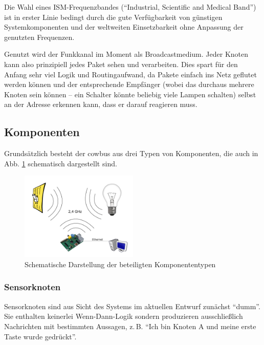 \documentclass{IEEEtran}
\begin{document}
        Die Wahl eines ISM-Frequenzbandes (\enquote{Industrial, Scientific and Medical Band})
        ist in erster Linie bedingt durch die gute Verfügbarkeit von günstigen
        Systemkomponenten und der weltweiten Einsetzbarkeit ohne Anpassung der
        genutzten Frequenzen.

        Genutzt wird der Funkkanal im Moment als Broadcastmedium.
        Jeder Knoten kann also prinzipiell jedes Paket sehen und verarbeiten.
        Dies spart für den Anfang sehr viel Logik und Routingaufwand,
        da Pakete einfach ins Netz geflutet werden können und der entsprechende
        Empfänger (wobei das durchaus mehrere Knoten sein können -- ein Schalter
        könnte beliebig viele Lampen schalten) selbst an der Adresse erkennen
        kann, dass er darauf reagieren muss.

    \subsection{Komponenten}
        Grundsätzlich besteht der cowbus aus drei Typen von Komponenten,
        die auch in Abb. \ref{fig:comp} schematisch dargestellt sind.

        \begin{figure}
            \centering
            \includegraphics[width=0.5\textwidth]{img/system}
            \caption{Schematische Darstellung der beteiligten Komponententypen}
            \label{fig:comp}
        \end{figure}

        \subsubsection{Sensorknoten}\label{Sensorknoten}
            Sensorknoten sind aus Sicht des Systems im aktuellen Entwurf
            zunächst \enquote{dumm}. Sie enthalten keinerlei Wenn-Dann-Logik
            sondern produzieren ausschließlich Nachrichten mit bestimmten
            Aussagen, z.\,B. \enquote{Ich bin Knoten A und meine erste Taste
            wurde gedrückt}.
\end{document}

